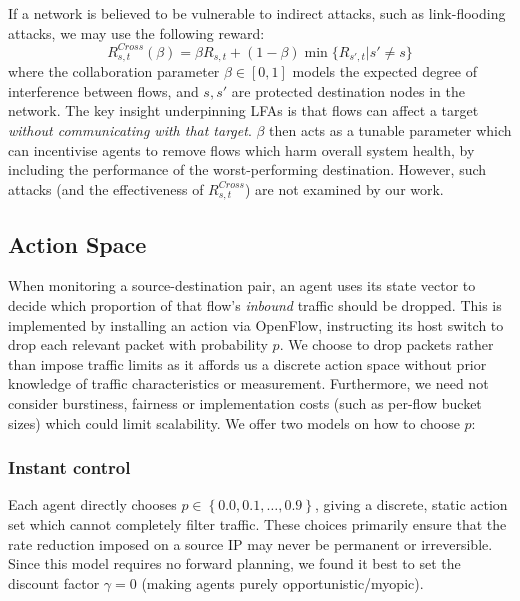 \documentclass[10pt, times, comsoc]{IEEEtran}
\begin{document}
If a network is believed to be vulnerable to indirect attacks, such as link-flooding attacks, we may use the following reward:
\begin{equation}
	R_{s,t}^{\mathit{Cross}}(\beta) = \beta R_{s,t} + (1 - \beta) \min{\{R_{s',t} | s' \ne s\}} \label{eqn:lfa-reward}
\end{equation}
where the collaboration parameter $\beta \in [0,1]$ models the expected degree of interference between flows, and $s, s'$ are protected destination nodes in the network.
The key insight underpinning LFAs is that flows can affect a target \emph{without communicating with that target}.
$\beta$ then acts as a tunable parameter which can incentivise agents to remove flows which harm overall system health, by including the performance of the worst-performing destination.
However, such attacks (and the effectiveness of $R_{s,t}^{\mathit{Cross}}$) are not examined by our work.

\subsection{Action Space}
When monitoring a source-destination pair, an agent uses its state vector to decide which proportion of that flow's \emph{inbound} traffic should be dropped.
This is implemented by installing an action via OpenFlow, instructing its host switch to drop each relevant packet with probability $p$.
We choose to drop packets rather than impose traffic limits as it affords us a discrete action space without prior knowledge of traffic characteristics or measurement.
Furthermore, we need not consider burstiness, fairness or implementation costs (such as per-flow bucket sizes) which could limit scalability.
We offer two models on how to choose $p$:

\subsubsection{Instant control}
Each agent directly chooses $p \in \left\{ 0.0, 0.1, \ldots, 0.9 \right\}$, giving a discrete, static action set which cannot completely filter traffic.
These choices primarily ensure that the rate reduction imposed on a source IP may never be permanent or irreversible.
Since this model requires no forward planning, we found it best to set the discount factor $\gamma=0$ (making agents purely opportunistic/myopic).
\end{document}
